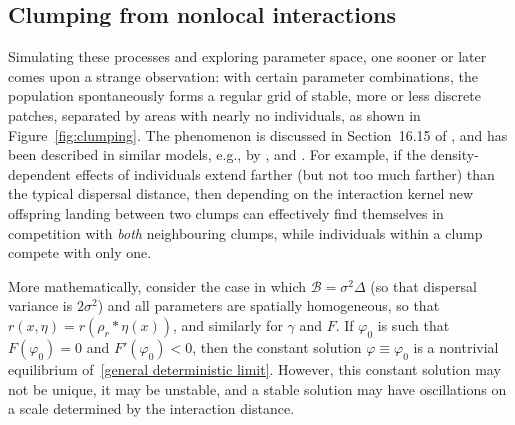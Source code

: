 \documentclass[EJP]{ejpecp} %
\newcommand{\DG}{\mathcal{B}}  %
\newcommand{\kernel}{\rho}  %
\newcommand{\smooth}[1]{\kernel_{#1} \! * \!}  %
\newcommand{\citet}[1]{\cite{#1}}
\begin{document}

\subsection{Clumping from nonlocal interactions}

Simulating these processes and exploring parameter space,
one sooner or later comes upon a strange observation:
with certain parameter combinations, the population spontaneously forms a regular grid
of stable, more or less discrete patches, separated by areas with nearly no individuals,
as shown in Figure~\ref{fig:clumping}.
The phenomenon is discussed in Section~16.15 of \citet{haller2022evolutionary},
and has been described in similar models, e.g.,
by \citet{britton1990spatial,sasaki1997clumped,hernandezgarcia2004clustering,young2001reproductive}, and \citet{berestycki2009nonlocal}.
For example, if the density-dependent effects of individuals extend farther (but not too much farther)
than the typical dispersal distance,
then depending on the interaction kernel
new offspring landing between two clumps
can effectively find themselves in competition with 
\emph{both} neighbouring clumps,
while individuals within a clump compete with only one.

More mathematically, consider the case in which
$\DG = \sigma^2 \Delta$
(so that dispersal variance is $2 \sigma^2$)
and all parameters are spatially homogeneous,
so that $r(x, \eta) = r(\smooth{r}\eta(x))$, and similarly for $\gamma$ and $F$.
If $\varphi_0$ is such that $F(\varphi_0)=0$ and $F'(\varphi_0)<0$, then the
constant solution $\varphi\equiv\varphi_0$ is a nontrivial equilibrium
of~\eqref{general deterministic limit}.
However, this constant solution may not be unique, it may be unstable,
and a stable solution may have oscillations on a scale determined by the interaction distance.
\end{document}
